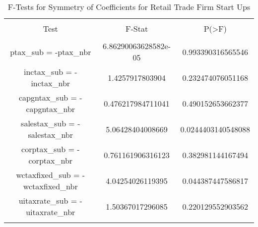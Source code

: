 
\begin{table}[!htbp] \centering 
  \caption{F-Tests for Symmetry of Coefficients for Retail Trade Firm Start Ups} 
  \label{} 
\begin{tabular}{@{\extracolsep{5pt}} ccc} 
\\[-1.8ex]\hline 
\hline \\[-1.8ex] 
Test & F-Stat & P(\textgreater F) \\ 
\hline \\[-1.8ex] 
ptax\_sub = -ptax\_nbr & 6.86290063628582e-05 & 0.993390316565546 \\ 
inctax\_sub = -inctax\_nbr & 1.4257917803904 & 0.232474076051168 \\ 
capgntax\_sub = -capgntax\_nbr & 0.476217984711041 & 0.490152653662377 \\ 
salestax\_sub = -salestax\_nbr & 5.06428404008669 & 0.0244403140548088 \\ 
corptax\_sub = -corptax\_nbr & 0.761161906316123 & 0.382981144167494 \\ 
wctaxfixed\_sub = -wctaxfixed\_nbr & 4.04254026119395 & 0.044387447586817 \\ 
uitaxrate\_sub = -uitaxrate\_nbr & 1.50367017296085 & 0.220129552903562 \\ 
\hline \\[-1.8ex] 
\end{tabular} 
\end{table} 
